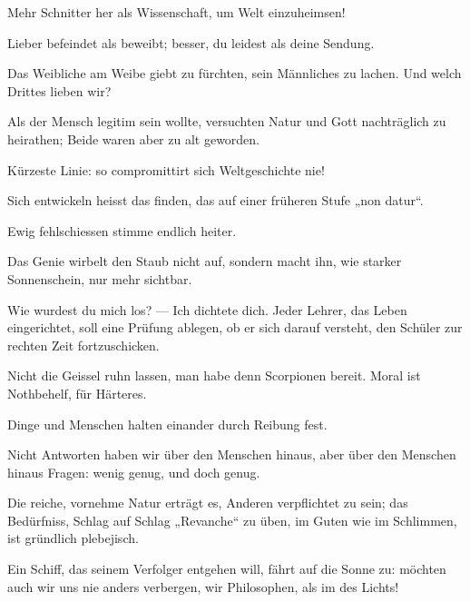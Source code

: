 Mehr Schnitter her als Wissenschaft, um Welt einzuheimsen!
\par

Lieber befeindet als beweibt; besser, du leidest als deine Sendung.
\par

Das Weibliche am Weibe giebt zu fürchten, sein Männliches zu lachen. Und welch Drittes lieben wir?
\par

Als der Mensch legitim sein wollte, versuchten Natur und Gott nachträglich zu heirathen; Beide waren aber zu alt geworden.
\par

Kürzeste Linie: so compromittirt sich Weltgeschichte nie!
\par

Sich entwickeln heisst das  finden, das auf einer früheren Stufe „non datur“.
\par

Ewig fehlschiessen stimme endlich heiter.
\par

Das Genie wirbelt den Staub nicht auf, sondern macht ihn, wie starker Sonnenschein, nur mehr sichtbar.
\par

Wie wurdest du mich los? — Ich dichtete dich. Jeder Lehrer, das Leben eingerichtet, soll eine Prüfung ablegen, ob er sich darauf versteht, den Schüler zur rechten Zeit fortzuschicken.
\par

Nicht die Geissel ruhn lassen, man habe denn Scorpionen bereit. Moral ist Nothbehelf, für Härteres.
\par

Dinge und Menschen halten einander durch Reibung fest.
\par

Nicht Antworten haben wir über den Menschen hinaus, aber über den Menschen hinaus Fragen: wenig genug, und doch genug.
\par

Die reiche, vornehme Natur erträgt es, Anderen verpflichtet zu sein; das Bedürfniss, Schlag auf Schlag „Revanche“ zu üben, im Guten wie im Schlimmen, ist gründlich plebejisch.
\par

Ein Schiff, das seinem Verfolger entgehen will, fährt auf die Sonne zu: möchten auch wir uns nie anders verbergen, wir Philosophen, als im  des Lichts!
\par

